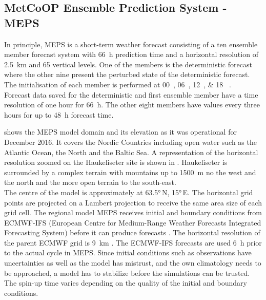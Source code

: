 \subsection{MetCoOP Ensemble Prediction System - MEPS}
In principle, MEPS is a short-term weather forecast consisting of a ten ensemble member  forecast system with \SI{66}{\hour} prediction time and a horizontal resolution of \SI{2.5}{\km} and 65 vertical levels. One of the members is the deterministic forecast where the other nine present the perturbed state of the deterministic forecast. The initialisation of each member is performed at \SIlist{00;06;12;18}{\UTC} \citep{metcoop_wiki_description_2017}.
\\ 
Forecast data saved for the deterministic and first ensemble member have a time resolution of one hour for \SI{66}{\hour}. The other eight members have values every three hours for up to \SI{48}{\hour} forecast time.

\noindent
{} shows the MEPS model domain and its elevation as it was operational for December 2016. It covers the Nordic Countries including open water such as the Atlantic Ocean, the North and the Baltic Sea. A representation of the horizontal resolution zoomed on the Haukeliseter site is shown in . Haukeliseter is surrounded by a complex terrain with mountains up to \SI{1500}{\metre} no the west and the north and the more open terrain to the south-east.
\\
The centre of the model is approximately at \ang{63.5}\,N, \ang{15}\,E. 
The horizontal grid points are projected on a Lambert projection to receive the same area size of each grid cell. 
The regional model MEPS receives initial and boundary conditions from ECMWF-IFS (European Centre for Medium-Range Weather Forecasts Integrated Forecasting System) before it can produce forecasts \citep{muller_arome-metcoop:_2017}. The horizontal resolution of the parent ECMWF grid is \SI{9}{\km} \citep{homleid_verification_2016}. The ECMWF-IFS forecasts are used \SI{6}{\hour} prior to the actual cycle in MEPS.
Since initial conditions such as observations have uncertainties as well as the model has mistrust, and  the own climatology needs to be approached, a model has to stabilize before the simulations can be trusted. The spin-up time varies depending on the quality of the initial and boundary conditions. 
